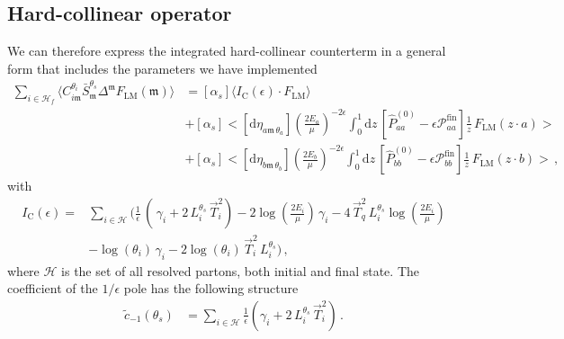\documentclass[a4paper, 12pt]{book}
\newcommand{\um}{\mathfrak{m}}
\begin{document}
\subsection{Hard-collinear operator}
We can therefore express the integrated hard-collinear counterterm in a general form that includes the parameters we have implemented
\begin{equation}
  \begin{aligned}
    \sum_{i \in \mathcal{H}_f} \langle C_{i\mathfrak{m}}^{\theta_i} \bar{S}_{\mathfrak{m}}^{\theta_s} \Delta^{\mathfrak{m}} F_{\mathrm{LM}}(\mathfrak{m})\rangle &= [\alpha_s]\langle I_{\mathrm{C}}(\epsilon) \cdot F_{\mathrm{LM}} \rangle \\
    & + [\alpha_s] \bigl< [\mathrm{d}\eta_{a\um \, \theta_a}] \left(\frac{2E_a}{\mu}\right)^{-2\epsilon} \int_{0}^{1} \mathrm{d}z \, \left[\hat{P}_{aa}^{(0)}-\epsilon \mathcal{P}_{aa}^{\mathrm{fin}}\right] \frac{1}{z} \, F_{\mathrm{LM}}(z\cdot a) \bigr> \\
    & + [\alpha_s] \bigl< [\mathrm{d}\eta_{b\um \, \theta_b}] \left(\frac{2E_b}{\mu}\right)^{-2\epsilon} \int_{0}^{1} \mathrm{d}z \, \left[\hat{P}_{bb}^{(0)}-\epsilon \mathcal{P}_{bb}^{\mathrm{fin}}\right] \frac{1}{z} \, F_{\mathrm{LM}}(z\cdot b) \bigr> \, ,
  \end{aligned}
\end{equation}
with
\begin{equation}
  \begin{aligned}
    I_{\mathrm{C}} (\epsilon) = &\sum_{i \in \mathcal{H}} \Biggl( \frac{1}{\epsilon}\, \left(\, \gamma_i+  2 \,L_i^{\theta_s} \,\vec{T}_i^2 \right) - 2 \log{\left(\frac{2E_i}{\mu}\right)}\, \gamma_i  - 4 \, \vec{T}_q^2 \, L_i^{\theta_s} \log{\left(\frac{2E_i}{\mu}\right)} \\
    & - \log{(\theta_i)} \, \gamma_i - 2 \log{(\theta_i)} \, \vec{T}_i^2 \, L_i^{\theta_s} \Biggr) \, ,
  \end{aligned}
\end{equation}
where $\mathcal{H}$ is the set of all resolved partons, both initial and final state. The coefficient of the $1/\epsilon$ pole has the following structure
\begin{equation}
  \begin{aligned}
  \tilde{c}_{-1}(\theta_s) & = \sum_{i \in \mathcal{H}} \frac{1}{\epsilon} \left( \gamma_i + 2 \, L_i^{\theta_s} \, \vec{T}_i^2 \right) \, .
  \label{coefficient-collinear}
  \end{aligned}
\end{equation}
\end{document}
